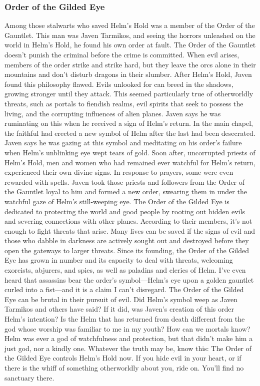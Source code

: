 \documentclass[10pt,a4paper,twoside,twocolumn,openany,bg=print,nodeprecatedcode]{dndbook}
\begin{document}
\subsubsection{Order of the Gilded Eye}
Among those stalwarts who saved Helm's Hold was a member of the Order of the Gauntlet. This man was Javen Tarmikos, and seeing the horrors unleashed on the world in Helm's Hold, he found his own order at fault. The Order of the Gauntlet doesn't punish the criminal before the crime is committed. When evil arises, members of the order strike and strike hard, but they leave the orcs alone in their mountains and don't disturb dragons in their slumber. After Helm's Hold, Javen found this philosophy flawed. Evils unlooked for can breed in the shadows, growing stronger until they attack. This seemed particularly true of otherworldly threats, such as portals to fiendish realms, evil spirits that seek to possess the living, and the corrupting influences of alien planes.
Javen says he was ruminating on this when he received a sign of Helm's return. In the main chapel, the faithful had erected a new symbol of Helm after the last had been desecrated. Javen says he was gazing at this symbol and meditating on his order's failure when Helm's unblinking eye wept tears of gold. Soon after, uncorrupted priests of Helm's Hold, men and women who had remained ever watchful for Helm's return, experienced their own divine signs. In response to prayers, some were even rewarded with spells. Javen took those priests and followers from the Order of the Gauntlet loyal to him and formed a new order, swearing them in under the watchful gaze of Helm's still-weeping eye.
The Order of the Gilded Eye is dedicated to protecting the world and good people by rooting out hidden evils and severing connections with other planes. According to their members, it's not enough to fight threats that arise. Many lives can be saved if the signs of evil and those who dabble in darkness are actively sought out and destroyed before they open the gateways to larger threats. Since its founding, the Order of the Gilded Eye has grown in number and its capacity to deal with threats, welcoming exorcists, abjurers, and spies, as well as paladins and clerics of Helm. I've even heard that assassins bear the order's symbol—Helm's eye upon a golden gauntlet curled into a fist—and it is a claim I can't disregard. The Order of the Gilded Eye can be brutal in their pursuit of evil.
Did Helm's symbol weep as Javen Tarmikos and others have said? If it did, was Javen's creation of this order Helm's intention? Is the Helm that has returned from death different from the god whose worship was familiar to me in my youth? How can we mortals know? Helm was ever a god of watchfulness and protection, but that didn't make him a just god, nor a kindly one.
Whatever the truth may be, know this: The Order of the Gilded Eye controls Helm's Hold now. If you hide evil in your heart, or if there is the whiff of something otherworldly about you, ride on. You'll find no sanctuary there.
\end{document}
